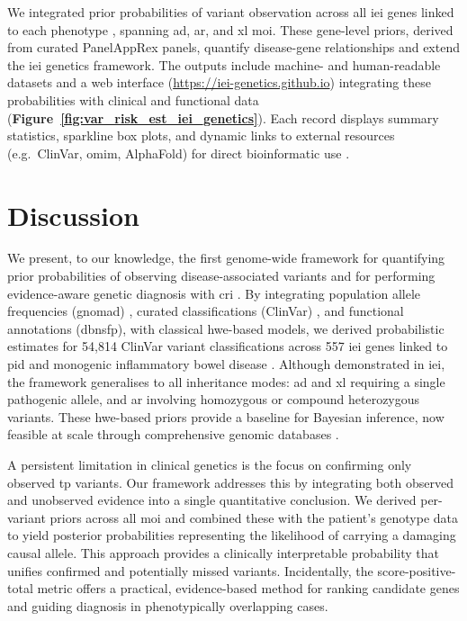 We integrated prior probabilities of variant observation across all \ac{iei} genes linked to each phenotype \cite{poli_human_2025}, spanning \ac{ad}, \ac{ar}, and \ac{xl}  \ac{moi}. These gene-level priors, derived from curated PanelAppRex panels, quantify disease-gene relationships and extend the \ac{iei} genetics framework. The outputs include machine- and human-readable datasets and a web interface (\url{https://iei-genetics.github.io}) integrating these probabilities with clinical and functional data (\textbf{Figure~\ref{fig:var_risk_est_iei_genetics}}). Each record displays summary statistics, sparkline box plots, and dynamic links to external resources (e.g.\ ClinVar, \ac{omim}, AlphaFold) for direct bioinformatic use \cite{lawless_2025_15111584}.

\FloatBarrier

\section{Discussion}

We present, to our knowledge, the first genome-wide framework for quantifying prior probabilities of observing disease-associated variants and for performing evidence-aware genetic diagnosis with \ac{cri} \cite{hannah_using_2024, bick_estimating_2025}. By integrating population allele frequencies (\ac{gnomad}) \cite{karczewski2020mutational}, curated classifications (ClinVar) \cite{landrum_clinvar_2018}, and functional annotations (\ac{dbnsfp}), with classical \ac{hwe}-based models, we derived probabilistic estimates for 54,814 ClinVar variant classifications across 557 \ac{iei} genes linked to \ac{pid} and monogenic inflammatory bowel disease \cite{lawless_panelapprex_2025, poli_human_2025}. 
Although demonstrated in \ac{iei}, the framework generalises to all inheritance modes: \ac{ad} and \ac{xl} requiring a single pathogenic allele, and \ac{ar} involving homozygous or compound heterozygous variants. These \ac{hwe}-based priors provide a baseline for Bayesian inference, now feasible at scale through comprehensive genomic databases \cite{landrum_clinvar_2018, karczewski2020mutational, lawless_panelapprex_2025, cheng_accurate_2023}.

A persistent limitation in clinical genetics is the focus on confirming only observed \ac{tp} variants. Our framework addresses this by integrating both observed and unobserved evidence into a single quantitative conclusion. We derived per-variant priors across all \ac{moi} and combined these with the patient's genotype data to yield posterior probabilities representing the likelihood of carrying a damaging causal allele. This approach provides a clinically interpretable probability that unifies confirmed and potentially missed variants. Incidentally, the score-positive-total metric offers a practical, evidence-based method for ranking candidate genes and guiding diagnosis in phenotypically overlapping cases.

